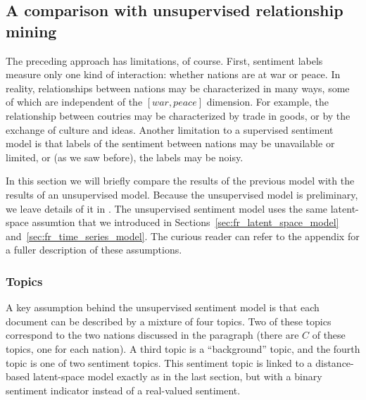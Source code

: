 \subsection*{A comparison with unsupervised relationship mining}


The preceding approach has limitations, of course.  First, sentiment
labels measure only one kind of interaction: whether nations are at
war or peace.  In reality, relationships between nations may be
characterized in many ways, some of which are independent of the $[
war, peace ]$ dimension.  For example, the relationship between
coutries may be characterized by trade in goods, or by the exchange of
culture and ideas.  Another limitation to a supervised sentiment model
is that labels of the sentiment between nations may be unavailable
or limited, or (as we saw before), the labels may be noisy.

In this section we will briefly compare the results of the previous
model with the results of an unsupervised model.  Because the
unsupervised model is preliminary, we leave details of it in
.  The unsupervised sentiment model
uses the same latent-space assumtion that we introduced in
Sections~\ref{sec:fr_latent_space_model}
and~\ref{sec:fr_time_series_model}.  The curious reader can refer to
the appendix for a fuller description of these assumptions.

\subsubsection*{Topics}
A key assumption behind the unsupervised sentiment model is that each
document can be described by a mixture of four topics.  Two of these
topics correspond to the two nations discussed in the paragraph (there
are $C$ of these topics, one for each nation).  A third topic is a
``background'' topic, and the fourth topic is one of two sentiment
topics.  This sentiment topic is linked to a distance-based
latent-space model exactly as in the last section, but with a binary
sentiment indicator instead of a real-valued sentiment.

